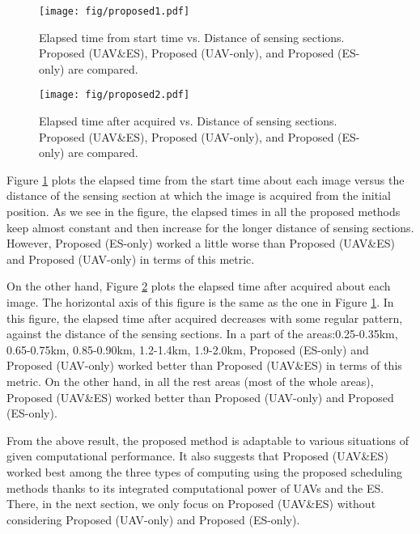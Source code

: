 \documentclass[journal]{IEEEtran}
\begin{document}
\begin{figure}[t]
\begin{center}
\texttt{[image: fig/proposed1.pdf]}
\caption{Elapsed time from start time vs. Distance of sensing sections. Proposed (UAV\&ES), Proposed (UAV-only), and Proposed (ES-only) are compared.}
\label{1}
\end{center}
\end{figure}

\begin{figure}[t]
\begin{center}
\texttt{[image: fig/proposed2.pdf]}
\caption{Elapsed time after acquired vs. Distance of sensing sections. Proposed (UAV\&ES), Proposed (UAV-only), and Proposed (ES-only) are compared.}
\label{2}
\end{center}
\end{figure}

Figure \ref{1} plots the elapsed time from the start time about each image versus the distance of the sensing section at which the image is acquired from the initial position.
%
As we see in the figure, the elapsed times in all the proposed methods keep almost constant and then increase for the longer distance of sensing sections.
%
However, Proposed (ES-only) worked a little worse than Proposed (UAV\&ES) and Proposed (UAV-only) in terms of this metric.

On the other hand, Figure \ref{2} plots the elapsed time after acquired about each image.
%
The horizontal axis of this figure is the same as the one in Figure \ref{1}.
%
In this figure, the elapsed time after acquired decreases with some regular pattern, against the distance of the sensing sections.
%
In a part of the areas:0.25-0.35km, 0.65-0.75km, 0.85-0.90km, 1.2-1.4km, 1.9-2.0km, Proposed (ES-only) and Proposed (UAV-only) worked better than Proposed (UAV\&ES) in terms of this metric.
On the other hand, in all the rest areas (most of the whole areas), Proposed (UAV\&ES) worked better than Proposed (UAV-only) and Proposed (ES-only).

From the above result, the proposed method is adaptable to various situations of given computational performance.
It also suggests that Proposed (UAV\&ES) worked best among the three types of computing using the proposed scheduling methods thanks to its integrated computational power of UAVs and the ES. 
%
There, in the next section, we only focus on Proposed (UAV\&ES) without considering Proposed (UAV-only) and Proposed (ES-only).
\end{document}
